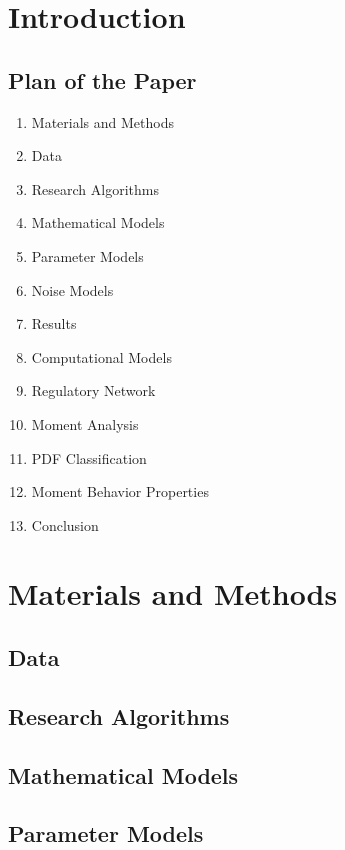 



\section{Introduction}

\subsection{Plan of the Paper}
\begin{enumerate}
	\item Materials and Methods
	\item Data
	\item Research Algorithms
	\item Mathematical Models
	\item Parameter Models
	\item Noise Models
	\item Results
	\item Computational Models
	\item Regulatory Network
	\item Moment Analysis
	\item PDF Classification
	\item Moment Behavior Properties
	\item Conclusion
\end{enumerate}
\section{Materials and Methods}

\subsection{Data}

\subsection{Research Algorithms}

\subsection{Mathematical Models}

\subsection{Parameter Models}

